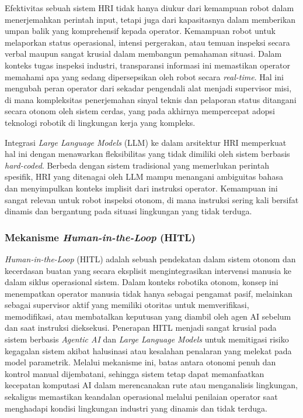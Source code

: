 Efektivitas sebuah sistem HRI tidak hanya diukur dari kemampuan robot dalam menerjemahkan perintah input, tetapi juga dari kapasitasnya dalam memberikan umpan balik yang komprehensif kepada operator. Kemampuan robot untuk melaporkan status operasional, intensi pergerakan, atau temuan inspeksi secara verbal maupun sangat krusial dalam membangun pemahaman situasi. Dalam konteks tugas inspeksi industri, transparansi informasi ini memastikan operator memahami apa yang sedang dipersepsikan oleh robot secara \textit{real-time}. Hal ini mengubah peran operator dari sekadar pengendali alat menjadi supervisor misi, di mana kompleksitas penerjemahan sinyal teknis dan pelaporan status ditangani secara otonom oleh sistem cerdas, yang pada akhirnya mempercepat adopsi teknologi robotik di lingkungan kerja yang kompleks.

Integrasi \textit{Large Language Models} (LLM) ke dalam arsitektur HRI memperkuat hal ini dengan menawarkan fleksibilitas yang tidak dimiliki oleh sistem berbasis \textit{hard-coded}. Berbeda dengan sistem tradisional yang memerlukan perintah spesifik, HRI yang ditenagai oleh LLM mampu menangani ambiguitas bahasa dan menyimpulkan konteks implisit dari instruksi operator. Kemampuan ini sangat relevan untuk robot inspeksi otonom, di mana instruksi sering kali bersifat dinamis dan bergantung pada situasi lingkungan yang tidak terduga.

\subsubsection{Mekanisme \textit{Human-in-the-Loop} (HITL)}
\textit{Human-in-the-Loop} (HITL) adalah sebuah pendekatan dalam sistem otonom dan kecerdasan buatan yang secara eksplisit mengintegrasikan intervensi manusia ke dalam siklus operasional sistem. Dalam konteks robotika otonom, konsep ini menempatkan operator manusia tidak hanya sebagai pengamat pasif, melainkan sebagai supervisor aktif yang memiliki otoritas untuk memverifikasi, memodifikasi, atau membatalkan keputusan yang diambil oleh agen AI sebelum dan saat instruksi dieksekusi. Penerapan HITL menjadi sangat krusial pada sistem berbasis \textit{Agentic AI} dan \textit{Large Language Models} untuk memitigasi risiko kegagalan sistem akibat halusinasi atau kesalahan penalaran yang melekat pada model parametrik. Melalui mekanisme ini, batas antara otonomi penuh dan kontrol manual dijembatani, sehingga sistem tetap dapat memanfaatkan kecepatan komputasi AI dalam merencanakan rute atau menganalisis lingkungan, sekaligus memastikan keandalan operasional melalui penilaian operator saat menghadapi kondisi lingkungan industri yang dinamis dan tidak terduga.

